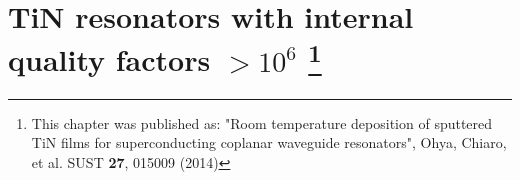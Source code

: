 \chapter[TiN]{TiN resonators with internal quality factors $>10^6$ \footnote{This chapter was published as: "Room temperature deposition of sputtered TiN films for superconducting coplanar waveguide resonators", Ohya, Chiaro, et al. SUST \textbf{27}, 015009 (2014)}}

